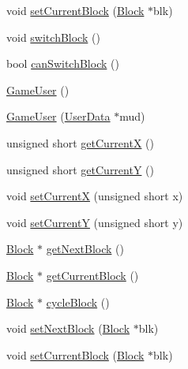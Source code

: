 \begin{DoxyCompactItemize}
\item 
void \hyperlink{class_tetris_1_1_users_1_1_game_user_ae1743f8024d25ed74d7b2e456907ee41}{set\+Current\+Block} (\hyperlink{class_tetris_1_1_block}{Block} $\ast$blk)
\item 
void \hyperlink{class_tetris_1_1_users_1_1_game_user_a1d1efa857420c82248fd12da9c08ef77}{switch\+Block} ()
\item 
bool \hyperlink{class_tetris_1_1_users_1_1_game_user_a8a777ef1ffbbc53ebae4172830863eb4}{can\+Switch\+Block} ()
\item 
\hyperlink{class_tetris_1_1_users_1_1_game_user_af9d7bed8e019ca4348995337ea7339b7}{Game\+User} ()
\item 
\hyperlink{class_tetris_1_1_users_1_1_game_user_a61819671f799d3d6cb2d89e99ffd1714}{Game\+User} (\hyperlink{class_tetris_1_1_users_1_1_user_data}{User\+Data} $\ast$mud)
\item 
unsigned short \hyperlink{class_tetris_1_1_users_1_1_game_user_ad25eace96bd27ae6df4a0c0d506be730}{get\+CurrentX} ()
\item 
unsigned short \hyperlink{class_tetris_1_1_users_1_1_game_user_af5bd7ff0b575af1b42b093488cff97e2}{get\+CurrentY} ()
\item 
void \hyperlink{class_tetris_1_1_users_1_1_game_user_a2957358b1a6298f06c6c2e10cb89f623}{set\+CurrentX} (unsigned short x)
\item 
void \hyperlink{class_tetris_1_1_users_1_1_game_user_aeedbe521004c22018b73a509e99f7d81}{set\+CurrentY} (unsigned short y)
\item 
\hyperlink{class_tetris_1_1_block}{Block} $\ast$ \hyperlink{class_tetris_1_1_users_1_1_game_user_a9fdd8809e412f1d9a665c0cfb15af48d}{get\+Next\+Block} ()
\item 
\hyperlink{class_tetris_1_1_block}{Block} $\ast$ \hyperlink{class_tetris_1_1_users_1_1_game_user_a83ae79738da7c0b42fc5e4f4c7016318}{get\+Current\+Block} ()
\item 
\hyperlink{class_tetris_1_1_block}{Block} $\ast$ \hyperlink{class_tetris_1_1_users_1_1_game_user_a6011fe9738235fa93fac51db4fafdbd7}{cycle\+Block} ()
\item 
void \hyperlink{class_tetris_1_1_users_1_1_game_user_a6249d0f4e9d77edd94935a74bbd298d5}{set\+Next\+Block} (\hyperlink{class_tetris_1_1_block}{Block} $\ast$blk)
\item 
void \hyperlink{class_tetris_1_1_users_1_1_game_user_ae1743f8024d25ed74d7b2e456907ee41}{set\+Current\+Block} (\hyperlink{class_tetris_1_1_block}{Block} $\ast$blk)
\item 

\end{DoxyCompactItemize}
